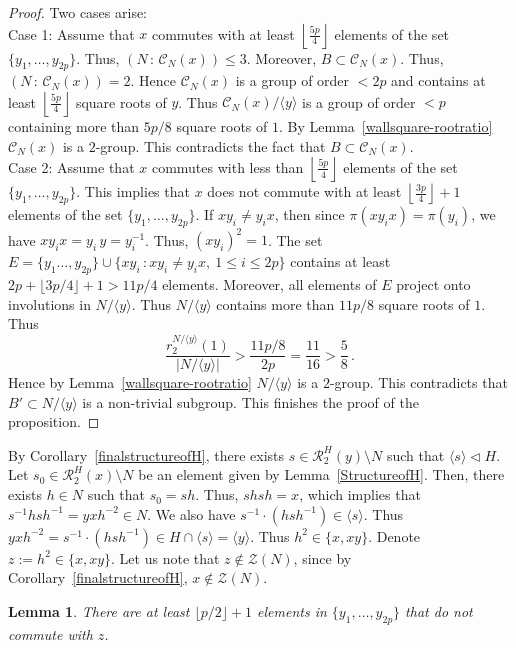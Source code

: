 \documentclass[12pt]{amsart}
\numberwithin{equation}{section}
\newtheorem{lem}[X]{Lemma}
\theoremstyle{definition}
\theoremstyle{remark}
\begin{document}
\begin{proof}
    Two cases arise:\\
    Case 1: Assume that $x$ commutes with at least $\left \lfloor \frac{5p}{4} \right \rfloor $ elements of the set $\{y_1,\dots,y_{2p}\}$. Thus, $(N\, \colon\,  \mathcal{C}_N(x))\le 3$. Moreover, $B\subset \mathcal{C}_N(x)$. Thus, $(N\, \colon\,  \mathcal{C}_N(x))=2$. Hence $\mathcal{C}_N(x)$ is a group of order $<2p$ and contains at least $\left \lfloor \frac{5p}{4} \right \rfloor $ square roots of $y$. Thus $\mathcal{C}_N(x)/\langle y\rangle$ is a group of order $<p$ containing more than $5p/8$ square roots of $1$. By Lemma~\ref{wallsquare-rootratio} $\mathcal{C}_N(x)$ is a $2$-group. This contradicts the fact that $B\subset \mathcal{C}_N(x)$. \\
    Case 2: Assume that $x$ commutes with less than $\left \lfloor \frac{5p}{4} \right \rfloor $ elements of the set $\{y_1,\dots,y_{2p}\}$. This implies that $x$ does not commute with at least $\left \lfloor \frac{3p}{4} \right \rfloor+1 $ elements of the set $\{y_1,\dots,y_{2p}\}$. If $xy_i\ne y_i x$, then since $\pi(xy_i x)=\pi(y_i)$, we have $x y_i x=y_i\, y=y_i^{-1}$. Thus, $(xy_i)^2=1$. The set $E=\{y_1\dots,y_{2p}\}\cup \{ xy_i\, :xy_i\ne y_ix,\ 1\le i\le 2p\}$ contains at least $2p+ \lfloor3p/4\rfloor+1>11p/4$ elements. Moreover, all elements of $E$ project onto involutions in $N/\langle y\rangle$. Thus $N/\langle y\rangle$ contains more than $11p/8$ square roots of $1$. Thus \[\frac{r_2^{N/\langle y\rangle}(1)}{|N/\langle y\rangle|}>\frac{11p/8}{2p}=\frac{11}{16}>\frac{5}{8}\, .\]
    Hence by Lemma~\ref{wallsquare-rootratio} $N/\langle y\rangle$ is a $2$-group. This contradicts that $B'\subset N/\langle y\rangle$ is a non-trivial subgroup. 
    This finishes the proof of the proposition.
\end{proof}
By Corollary~\ref{finalstructureofH}, there exists $s\in \mathcal{R}_2^H(y)\setminus N$ such that $\langle s\rangle \lhd H$. Let $s_0\in \mathcal{R}_2^H(x)\setminus N$ be an element given by Lemma~\ref{StructureofH}. Then, there exists $h\in N$ such that $s_0=sh$. Thus, $shsh=x$, which implies that $s^{-1}hsh^{-1}=yx h^{-2}\in N$. We also have $s^{-1}\cdot (hsh^{-1})\in \langle s\rangle$. Thus $yxh^{-2}=s^{-1}\cdot (hsh^{-1})\in H\cap \langle s\rangle =\langle y\rangle$. Thus $h^2\in \{x,xy\}$. Denote $z:=h^2\in \{x,xy\}$. Let us note that $z\notin \mathcal{Z}(N)$, since by Corollary~\ref{finalstructureofH}, $x\notin \mathcal{Z}(N)$.
\begin{lem}
    There are at least $\lfloor p/2\rfloor+1$ elements in $\{y_1,\dots,y_{2p}\}$ that do not commute with $z$.
\end{lem}
\end{document}
